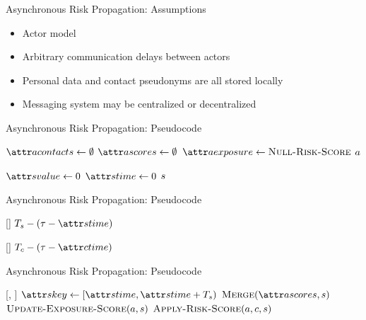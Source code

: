 \documentclass[11pt]{beamer}
\begin{document}
\begin{frame}{Asynchronous Risk Propagation: Assumptions}
\begin{itemize}
  \item Actor model \citep{Hewitt1973, Hewitt1977a, Hewitt1977b, Agha1985}
  \item Arbitrary communication delays between actors
  \item Personal data and contact pseudonyms are all stored locally
  \item Messaging system may be centralized or decentralized
\end{itemize}
\end{frame}

\begin{frame}{Asynchronous Risk Propagation: Pseudocode}
\begin{function}{\nCreateActor}
  \State $\aActorContacts \assign \emptyset$
  \State $\aActorScores \assign \emptyset$
  \State $\aActorExposure \assign \cNullRiskScore$
  \State \Return $a$
\end{function}
\begin{function}{\nNullRiskScore}
  \State $\aScoreValue \assign 0$
  \State $\aScoreTime \assign 0$
  \State \Return $s$
\end{function}
\end{frame}

\begin{frame}{Asynchronous Risk Propagation: Pseudocode}
\begin{function}{\nRiskScoreTtl}[\vScore]
  \State \Return $\pScoreExpiry - (\vReferenceTime - \aScoreTime)$
\end{function}
\begin{function}{\nContactTtl}[\vContact]
  \State \Return $\pContactExpiry - (\vReferenceTime - \aContactTime)$
\end{function}
\end{frame}

\begin{frame}{Asynchronous Risk Propagation: Pseudocode}
\begin{function}{\nHandleRiskScore}[\vActor, \vScore]
    \State $\aScoreKey \assign [\aScoreTime, \aScoreTime + \pScoreExpiry)$
    \State $\cMerge[\aActorScores, \vScore]$
    \State $\cUpdateExposureScore[\vActor, \vScore]$
    \ForEach{$\vContact \in \aActorContacts$}
      \State $\cApplyRiskScore[\vActor, \vContact, \vScore]$
    \EndFor
  \EndIf
\end{function}
\end{frame}
\end{document}

